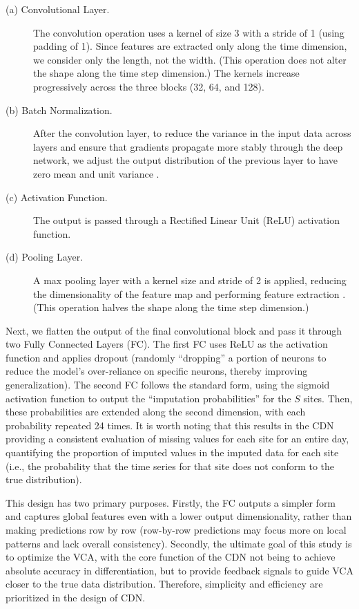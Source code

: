 \documentclass[3p,11pt,authoryear]{elsarticle}
\begin{document}
\begin{description}
	\item[(a) Convolutional Layer.] The convolution operation uses a kernel of size 3 with a stride of 1 (using padding of 1). Since features are extracted only along the time dimension, we consider only the length, not the width. (This operation does not alter the shape along the time step dimension.) The kernels increase progressively across the three blocks (32, 64, and 128). 
	\item[(b) Batch Normalization.] After the convolution layer, to reduce the variance in the input data across layers and ensure that gradients propagate more stably through the deep network, we adjust the output distribution of the previous layer to have zero mean and unit variance \citep{ioffe2015batch}. 
	\item[(c) Activation Function.] The output is passed through a Rectified Linear Unit (ReLU) activation function. 
	\item[(d) Pooling Layer.] A max pooling layer with a kernel size and stride of 2 is applied, reducing the dimensionality of the feature map and performing feature extraction \citep{lecun1998gradient}. (This operation halves the shape along the time step dimension.) 
\end{description}

Next, we flatten the output of the final convolutional block and pass it through two Fully Connected Layers (FC). The first FC uses ReLU as the activation function and applies dropout (randomly ``dropping'' a portion of neurons to reduce the model's over-reliance on specific neurons, thereby improving generalization). The second FC follows the standard form, using the sigmoid activation function to output the ``imputation probabilities'' for the $S$ sites. Then, these probabilities are extended along the second dimension, with each probability repeated 24 times. 
It is worth noting that this results in the CDN providing a consistent evaluation of missing values for each site for an entire day, quantifying the proportion of imputed values in the imputed data for each site (i.e., the probability that the time series for that site does not conform to the true distribution). 

This design has two primary purposes. Firstly, the FC outputs a simpler form and captures global features even with a lower output dimensionality, rather than making predictions row by row (row-by-row predictions may focus more on local patterns and lack overall consistency). Secondly, the ultimate goal of this study is to optimize the VCA, with the core function of the CDN not being to achieve absolute accuracy in differentiation, but to provide feedback signals to guide VCA closer to the true data distribution. Therefore, simplicity and efficiency are prioritized in the design of CDN. 
\end{document}
